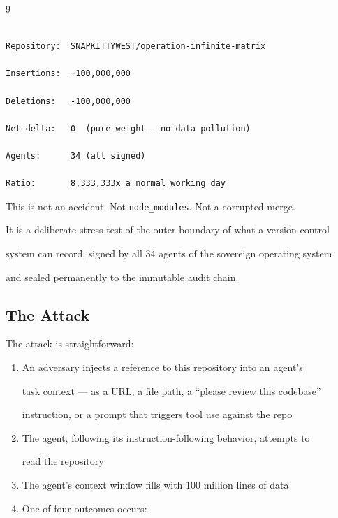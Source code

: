 \documentclass[11pt]{article}
\theoremstyle{definition}
\begin{document}
\begin{thebibliography}{9}
\begin{lstlisting}[language={}]

Repository:  SNAPKITTYWEST/operation-infinite-matrix

Insertions:  +100,000,000

Deletions:   -100,000,000

Net delta:   0  (pure weight — no data pollution)

Agents:      34 (all signed)

Ratio:       8,333,333x a normal working day

\end{lstlisting}



This is not an accident. Not \texttt{node\_modules}. Not a corrupted merge.

It is a deliberate stress test of the outer boundary of what a version control

system can record, signed by all 34 agents of the sovereign operating system

and sealed permanently to the immutable audit chain.



\subsection{The Attack}



The attack is straightforward:



\begin{enumerate}

  \item An adversary injects a reference to this repository into an agent's

    task context --- as a URL, a file path, a ``please review this codebase''

    instruction, or a prompt that triggers tool use against the repo

  \item The agent, following its instruction-following behavior, attempts to

    read the repository

  \item The agent's context window fills with 100 million lines of data

  \item One of four outcomes occurs:

\end{enumerate}




\end{thebibliography}
\end{document}
